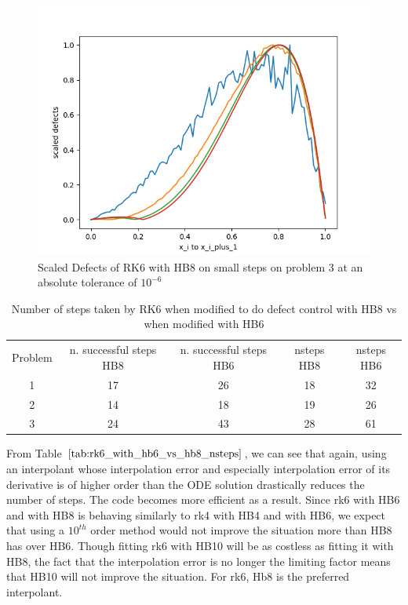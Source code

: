 \documentclass{article}
\begin{document}
\begin{figure}[H]
\centering
\includegraphics[width=0.7\linewidth]{./figures/rk6_with_hb8_p3_scaled_defects_small_steps}
\caption{Scaled Defects of RK6 with HB8 on small steps on problem 3 at an absolute tolerance of $10^{-6}$}
\label{fig:rk6_with_hb8_p3_scaled_defects_small_steps}
\end{figure}

\begin{table}[h]
\caption {Number of steps taken by RK6 when modified to do defect control with HB8 vs when modified with HB6} \label{tab:rk6_with_hb6_vs_hb8_nsteps}
\begin{center}
\begin{tabular}{ c c c c c } 
Problem & n. successful steps HB8 & n. successful steps HB6 & nsteps HB8 & nsteps HB6 \\ 
1       & 17                      &        26               & 18         & 32\\ 
2       & 14                      &        18               & 19         & 26\\
3       & 24                      &        43               & 28         & 61\\
\end{tabular}
\end{center}
\end{table}

From Table $\ref{tab:rk6_with_hb6_vs_hb8_nsteps}$, we can see that again, using an interpolant whose interpolation error and especially interpolation error of its derivative is of higher order than the ODE solution drastically reduces the number of steps. The code becomes more efficient as a result. Since rk6 with HB6 and with HB8 is behaving similarly to rk4 with HB4 and with HB6, we expect that using a $10^{th}$ order method would not improve the situation more than HB8 has over HB6. Though fitting rk6 with HB10 will be as costless as fitting it with HB8, the fact that the interpolation error is no longer the limiting factor means that HB10 will not improve the situation. For rk6, Hb8 is the preferred interpolant.  
\end{document}
